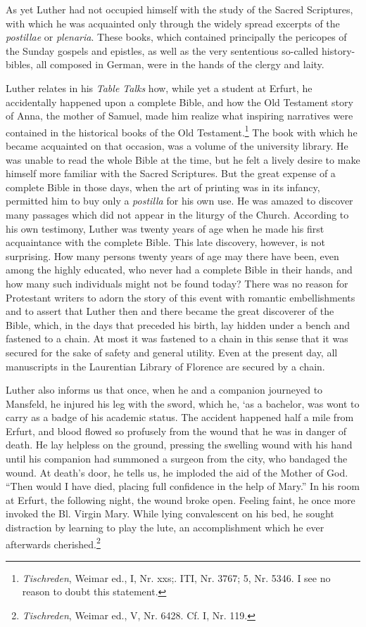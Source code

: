 As yet Luther had not occupied himself with the study of the
Sacred Scriptures, with which he was acquainted only through the
widely spread excerpts of the \textit{postillae} or \textit{plenaria}. These books, which
contained principally the pericopes of the Sunday gospels and epistles, as well as the very sententious so-called history-bibles, all composed in German, were in the hands of the clergy and laity.

Luther relates in his \textit{Table Talks} how, while yet a student at Erfurt,
he accidentally happened upon a complete Bible, and how the
Old Testament story of Anna, the mother of Samuel, made him
realize what inspiring narratives were contained in the historical
books of the Old Testament.\footnote{\textit{Tischreden}, Weimar ed., I, Nr. xxs;. ITI, Nr. 3767; 5, Nr. 5346. I see no reason to doubt this statement.}
The book with which he became acquainted on that occasion, was a volume of the university library.
He was unable to read the whole Bible at the time, but he felt a lively
desire to make himself more familiar with the Sacred Scriptures.
But the great expense of a complete Bible in those days, when the
art of printing was in its infancy, permitted him to buy only a
\textit{postilla} for his own use. He was amazed to discover many passages
which did not appear in the liturgy of the Church. According to
his own testimony, Luther was twenty years of age when he made
his first acquaintance with the complete Bible. This late discovery,
however, is not surprising. How many persons twenty years of age
may there have been, even among the highly educated, who never
had a complete Bible in their hands, and how many such individuals
might not be found today? There was no reason for Protestant
writers to adorn the story of this event with romantic embellishments
and to assert that Luther then and there became the great
discoverer of the Bible, which, in the days that preceded his birth,
lay hidden under a bench and fastened to a chain. At most it was
fastened to a chain in this sense that it was secured for the sake
of safety and general utility. Even at the present day, all manuscripts
in the Laurentian Library of Florence are secured by a chain.

Luther also informs us that once, when he and a companion
journeyed to Mansfeld, he injured his leg with the sword, which he,
‘as a bachelor, was wont to carry as a badge of his academic
status. The accident happened half a mile from Erfurt, and blood
flowed so profusely from the wound that he was in danger of death.
He lay helpless on the ground, pressing the swelling wound with his
hand until his companion had summoned a surgeon from the city,
who bandaged the wound. At death’s door, he tells us, he imploded
the aid of the Mother of God. “Then would I have died, placing
full confidence in the help of Mary.” In his room at Erfurt, the following
night, the wound broke open. Feeling faint, he once more
invoked the Bl. Virgin Mary. While lying convalescent on his bed,
he sought distraction by learning to play the lute, an accomplishment which he ever afterwards cherished.\footnote{\textit{Tischreden}, Weimar ed., V, Nr. 6428. Cf. I, Nr. 119.}

